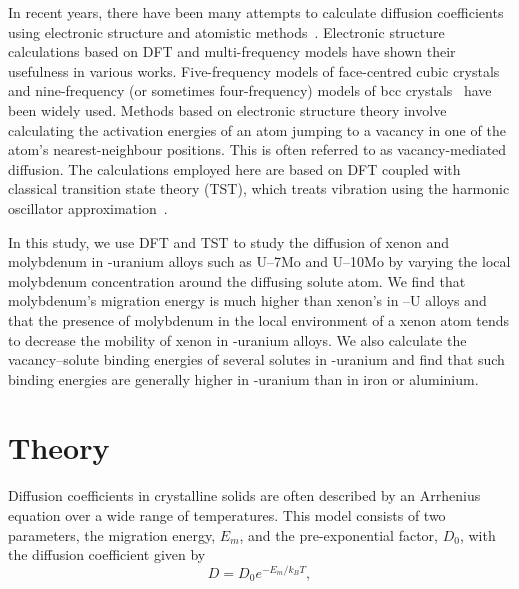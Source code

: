 In recent years, there have been many attempts to calculate diffusion
coefficients using electronic structure and atomistic
methods~\cite{adams1989self, blochl1993first, blochl1990first, frank1996first,
    janotti2004solute, krvcmar2005diffusion, milman1993free, sandberg2002self}.
Electronic structure calculations based on DFT and multi-frequency models have
shown their usefulness in various works.
Five-frequency models of face-centred cubic
    crystals~\cite{lidiard1955,lidiard1960, leclaire1956} and
nine-frequency (or sometimes four-frequency) models of bcc
crystals~\cite{leclaire1970, mehrer2007diffusion} have been widely used.
Methods based on electronic structure theory involve calculating the activation
energies of an atom jumping to a vacancy in one of the atom's nearest-neighbour
positions. This is often referred to as vacancy-mediated diffusion.
The calculations employed here are based on DFT coupled with classical
transition state theory (TST), which treats vibration using the
harmonic oscillator
approximation~\cite{vineyard1954theory, vineyard1957frequency}.

In this study, we use DFT and TST to study the diffusion of xenon and
molybdenum in \textgamma-uranium alloys such as U--7Mo and U--10Mo by varying the local molybdenum concentration around the diffusing solute atom.
We find that molybdenum's migration energy is much higher than xenon's in
\textgamma--U alloys and that the presence of molybdenum in the local
environment of a xenon atom tends to
decrease the mobility of xenon in \textgamma-uranium alloys.
We also calculate the vacancy--solute binding energies of several solutes
in \textgamma-uranium and find that such binding energies are generally
higher in \textgamma-uranium than in iron or aluminium.



\section{Theory}\label{sec_theory}
Diffusion coefficients in crystalline solids are often described by an
Arrhenius equation over a wide range of temperatures. This model consists of
two parameters, the migration energy, $E_m$, and the pre-exponential factor,
$D_0$, with the diffusion coefficient given by
\begin{equation}
    D = D_0 e^{-E_m/k_B T},
\end{equation}



